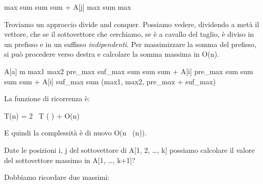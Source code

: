\begin{algorithm}
\begin{algorithmic}
    \State max 
        \State sum 
            \State sum \gets sum + A[j]
        \EndFor
            \State max \gets sum
        \EndIf
    \EndFor
    \State \Return max
\EndFunction
\end{algorithmic}
\end{algorithm}

Troviamo un approccio divide and conquer. Possiamo vedere, dividendo a met\`a il vettore, che se il sottovettore che cerchiamo, se \`e a cavallo del taglio, \`e diviso in un prefisso e in un suffisso \emph{indipendenti}. Per massimizzare la somma del prefisso, si pu\`o procedere verso destra e calcolare la somma massima in O(n).

\begin{algorithm}
\begin{algorithmic}
            \State \Return A[a]
        \Else
            \State {}
        \EndIf
    \Else
        \State m \gets {}
        \State max1 \gets {}
        \State max2 \gets {}
        \State pre_max 
        \State suf_max 
        \State sum 
            \State sum \gets sum + A[i]
                \State pre_max \gets sum
            \EndIf
        \EndFor
        \State sum 
            \State sum \gets sum + A[i]
                \State suf_max \gets sum
            \EndIf
        \EndFor
        \State \Return \max (max1, max2, pre_max + suf_max)
    \EndIf
\EndFunction
\end{algorithmic}
\end{algorithm}

La funzione di ricorrenza \`e:

T(n) = 2 \, T \left(  \right) + O(n)

E quindi la complessit\`a \`e di nuovo O(n \, \log(n)).

Date le posizioni i, j del sottovettore di A[1, 2, \ldots, k] possiamo calcolare il valore del sottovettore massimo in A[1, \ldots, k+1]?

Dobbiamo ricordare due massimi:

